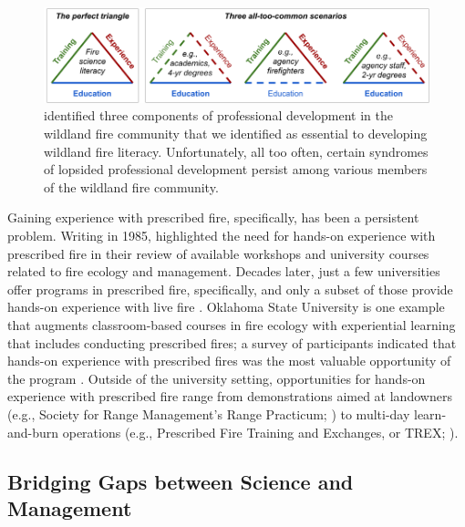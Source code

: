 \documentclass[fire,casereport,accept,moreauthors,pdftex]{Definitions/mdpi}  %
\begin{document}
\begin{figure}[H]
\includegraphics[width=1\columnwidth]{FireTrainingTriangles.png}
\caption{\citet{kobziar2009} {identified three} components of professional development in the wildland fire community that we identified as essential to developing wildland fire literacy. Unfortunately, all too often, certain syndromes of lopsided professional development persist among various members of the wildland fire community. \label{FireTrainingTriangles}}  %

\end{figure}

Gaining experience with prescribed fire, specifically, has been a persistent problem.
Writing in 1985, \citet{heitlinger1985} highlighted the need for hands-on experience with prescribed fire in their review of available workshops and university courses related to fire ecology and management.
Decades later, just a few universities offer programs in prescribed fire, specifically, and only a subset of those provide hands-on experience with live fire \citep{kobziar2009}.
Oklahoma State University is one example that augments classroom-based courses in fire ecology with experiential learning that includes conducting prescribed fires; a survey of participants indicated that hands-on experience with prescribed fires was the most valuable opportunity of the program \citep{scasta2015}.
Outside of the university setting, opportunities for hands-on experience with prescribed fire range from demonstrations aimed at landowners (e.g., Society for Range Management's Range Practicum; \citep{barnes2021}) to multi-day learn-and-burn operations (e.g., Prescribed Fire Training and Exchanges, or TREX; \citep{spencer2015}).

\subsection{Bridging Gaps between Science and Management}
\end{document}
